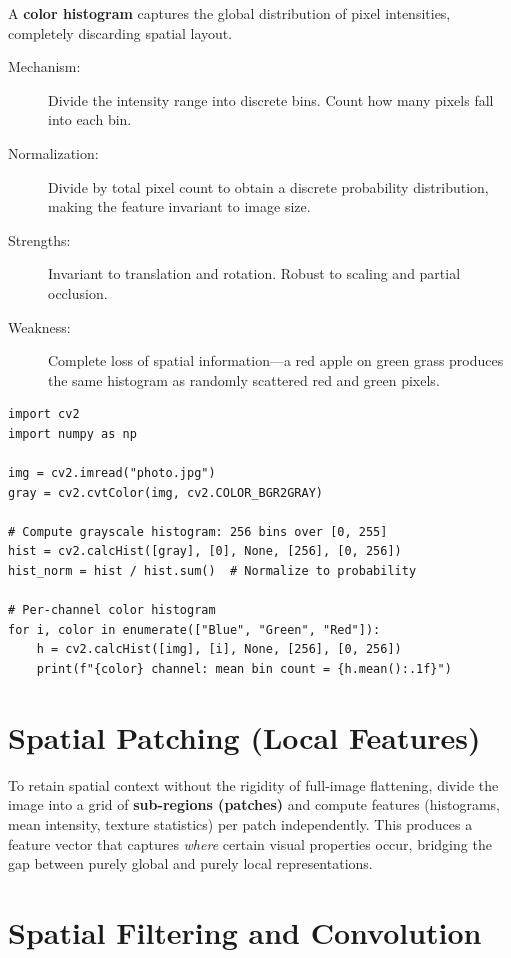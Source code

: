 A \textbf{color histogram} captures the global distribution of pixel intensities, completely discarding spatial layout.

\begin{description}
    \item[Mechanism:] Divide the intensity range into discrete bins. Count how many pixels fall into each bin.
    \item[Normalization:] Divide by total pixel count to obtain a discrete probability distribution, making the feature invariant to image size.
    \item[Strengths:] Invariant to translation and rotation. Robust to scaling and partial occlusion.
    \item[Weakness:] Complete loss of spatial information---a red apple on green grass produces the same histogram as randomly scattered red and green pixels.
\end{description}

\begin{lstlisting}[style=pythonstyle]
import cv2
import numpy as np

img = cv2.imread("photo.jpg")
gray = cv2.cvtColor(img, cv2.COLOR_BGR2GRAY)

# Compute grayscale histogram: 256 bins over [0, 255]
hist = cv2.calcHist([gray], [0], None, [256], [0, 256])
hist_norm = hist / hist.sum()  # Normalize to probability

# Per-channel color histogram
for i, color in enumerate(["Blue", "Green", "Red"]):
    h = cv2.calcHist([img], [i], None, [256], [0, 256])
    print(f"{color} channel: mean bin count = {h.mean():.1f}")
\end{lstlisting}

\section*{Spatial Patching (Local Features)}

To retain spatial context without the rigidity of full-image flattening, divide the image into a grid of \textbf{sub-regions (patches)} and compute features (histograms, mean intensity, texture statistics) per patch independently. This produces a feature vector that captures \textit{where} certain visual properties occur, bridging the gap between purely global and purely local representations.

\section*{Spatial Filtering and Convolution}

